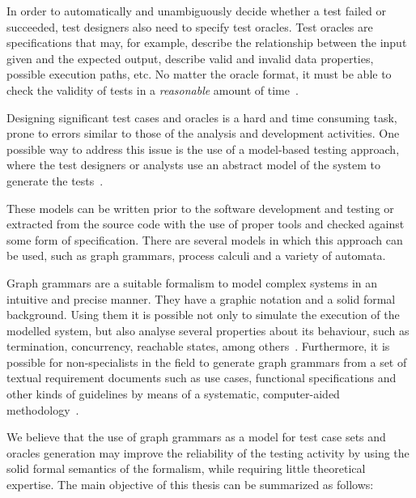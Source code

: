 In order to automatically and unambiguously decide whether a test failed or succeeded, test designers also need to specify test oracles. Test oracles are specifications that may, for example, describe the relationship between the input given and the expected output, describe valid and invalid data properties, possible execution paths, etc. No matter the oracle format, it must be able to check the validity of tests in a \textit{reasonable} amount of time~\cite{Weyuker1982}.

Designing significant test cases and oracles is a hard and time consuming task, prone to errors similar to those of the analysis and development activities. One possible way to address this issue is the use of a model-based testing approach, where the test designers or analysts use an abstract model of the system to generate the tests~\cite{Utting2006}. 

These models can be written prior to the software development and testing or extracted from the source code with the use of proper tools and checked against some form of specification. There are several models in which this approach can be used, such as graph grammars, process calculi and a variety of automata. 

Graph grammars are a suitable formalism to model complex systems in an intuitive and precise manner. They have a graphic notation and a solid formal background.  Using them it is possible not only to simulate the execution of the modelled system, but also analyse several properties about its behaviour, such as termination, concurrency, reachable states, among others~\cite{Ehrig2006}. Furthermore, it is possible for non-specialists in the field to generate graph grammars from a set of textual requirement documents such as use cases, functional specifications and other kinds of guidelines by means of a systematic, computer-aided methodology~\cite{Junior2015,BezerraWEIT2016,Cota2017}.

We believe that the use of graph grammars as a model for test case sets and oracles generation may improve the reliability of the testing activity by using the solid formal semantics of the formalism, while requiring little theoretical expertise. The main objective of this thesis can be summarized as follows:

\begin{intuition}
\end{intuition}\hfill\break


